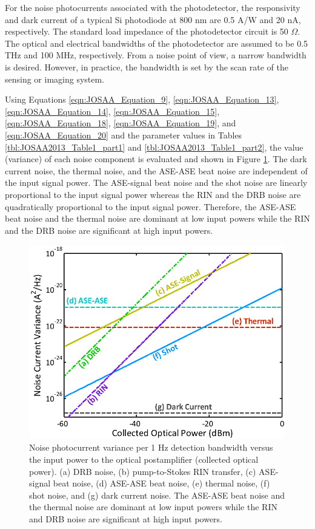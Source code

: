 For the noise photocurrents associated with the photodetector, the responsivity and dark current of a typical Si photodiode at 800 nm are 0.5 A/W and 20 nA, respectively. The standard load impedance of the photodetector circuit is 50 $\Omega$. The optical and electrical bandwidths of the photodetector are assumed to be 0.5 THz and 100 MHz, respectively. From a noise point of view, a narrow bandwidth is desired. However, in practice, the bandwidth is set by the scan rate of the sensing or imaging system.

Using Equations \eqref{eqn:JOSAA_Equation_9}, \eqref{eqn:JOSAA_Equation_13}, \eqref{eqn:JOSAA_Equation_14}, \eqref{eqn:JOSAA_Equation_15}, \eqref{eqn:JOSAA_Equation_18}, \eqref{eqn:JOSAA_Equation_19}, and \eqref{eqn:JOSAA_Equation_20} and the parameter values in Tables \ref{tbl:JOSAA2013_Table1_part1} and \ref{tbl:JOSAA2013_Table1_part2}, the value (variance) of each noise component is evaluated and shown in Figure \ref{fig:JOSAA2013_Figure3}. The dark current noise, the thermal noise, and the ASE-ASE beat noise are independent of the input signal power. The ASE-signal beat noise and the shot noise are linearly proportional to the input signal power whereas the RIN and the DRB noise are quadratically proportional to the input signal power. Therefore, the ASE-ASE beat noise and the thermal noise are dominant at low input powers while the RIN and the DRB noise are significant at high input powers.

\begin{figure}[htb!]
\centering
\includegraphics[scale=1]{JOSAA2013/Figure3.png}
\caption{Noise photocurrent variance per 1 Hz detection bandwidth versus the input power to the optical postamplifier (collected optical power). (a) DRB noise, (b) pump-to-Stokes RIN transfer, (c) ASE-signal beat noise, (d) ASE-ASE beat noise, (e) thermal noise, (f) shot noise, and (g) dark current noise. The ASE-ASE beat noise and the thermal noise are dominant at low input powers while the RIN and DRB noise are significant at high input powers.}
\label{fig:JOSAA2013_Figure3}
\end{figure}

